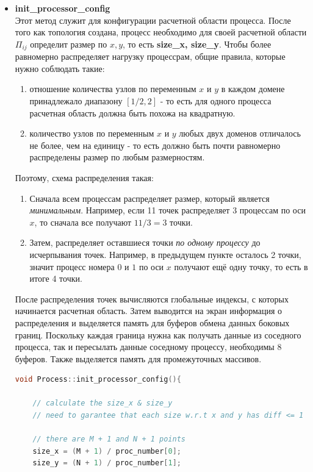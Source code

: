 \documentclass{article}
\begin{document}
\begin{itemize}
    \item \textbf{init\_processor\_config}\\
    Этот метод служит для конфигурации расчетной области процесса. После того как топология создана, процесс необходимо для своей расчетной области $\Pi_{ij}$ определит размер по $x, y$, то есть \textbf{size\_x, size\_y}. Чтобы более равномерно распределяет нагрузку процессрам, общие правила, которые нужно соблюдать такие:
    \begin{enumerate}
        \item отношение количества узлов по переменным $x$ и $y$ в каждом домене принадлежало диапазону $[1/2,2]$ - то есть для одного процесса расчетная область должна быть похожа на квадратную.
        \item количество узлов по переменным $x$ и $y$ любых двух доменов отличалось не более, чем на единицу - то есть должно быть почти равномерно распределены размер по любым размерностям.
    \end{enumerate}
    Поэтому, схема распределения такая:
    \begin{enumerate}
        \item Сначала всем процессам распределяет размер, который является \textit{минимальным}. Например, если 11 точек распределяет 3 процессам по оси $x$, то сначала все получают $11 /3 = 3$ точки.
        \item Затем, распределяет оставшиеся точки \textit{по одному процессу} до исчерпывания точек. Например, в предыдущем пункте осталось 2 точки, значит процесс номера $0$ и $1$ по оси $x$ получают ещё одну точку, то есть в итоге 4 точки.
    \end{enumerate}
    После распределения точек вычисляются глобальные индексы, с которых начинается расчетная область. Затем выводится на экран информация о распределения и выделяется память для буферов обмена данных боковых границ. Поскольку каждая граница нужна как получать данные из соседного процесса, так и пересылать данные соседному процессу, необходимы 8 буферов. Также выделяется память для промежуточных массивов.
    
    \begin{lstlisting}[language=C, caption=Process::init\_processor\_config()]
void Process::init_processor_config(){

    // calculate the size_x & size_y
    // need to garantee that each size w.r.t x and y has diff <= 1

    // there are M + 1 and N + 1 points
    size_x = (M + 1) / proc_number[0];
    size_y = (N + 1) / proc_number[1];


\end{lstlisting}
\end{itemize}
\end{document}
